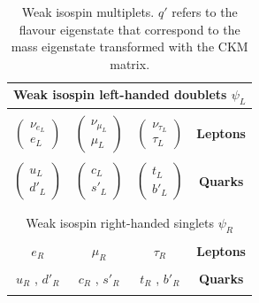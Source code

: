 \begin{table}[htb]\centering\begin{tabular}{cccc}\toprule
\multicolumn{4}{c}{Weak isospin left-handed doublets \bfseries $\psi_{L}$} \\ \midrule \\ 
$\begin{pmatrix} \nu_{e_{L}} \\ e_{L} \end{pmatrix}$ & $\begin{pmatrix} \nu_{\mu_{L}} \\ \mu_{L} \end{pmatrix}$ &$\begin{pmatrix} \nu_{\tau_{L}} \\ \tau_{L} \end{pmatrix}$ & \bfseries Leptons \\ \\ 
$\begin{pmatrix} u_{L} \\ d'_{L} \end{pmatrix}$ & $\begin{pmatrix} c_{L} \\ s'_{L} \end{pmatrix}$ &$\begin{pmatrix} t_{L} \\ b'_{L} \end{pmatrix}$ & \bfseries Quarks \\
 \\ \bottomrule\\ \toprule
\multicolumn{4}{c}{Weak isospin right-handed singlets \bfseries $\psi_{R}$} \\ \midrule \\ 
$ e_{R} $ & $ \mu_{R}$ &$\tau_{R}$ & \bfseries Leptons \\ \\ 
$u_{R}$ , $d'_{R} $ & $c_{R}$ , $s'_{R} $ &$ t_{R}$ , $b'_{R}$ & \bfseries Quarks \\
 \\ \bottomrule
\end{tabular}\caption{Weak isospin multiplets. $q'$ refers to the flavour eigenstate that correspond to the mass eigenstate transformed with the CKM matrix.}\label{tab:isospin} \end{table}

